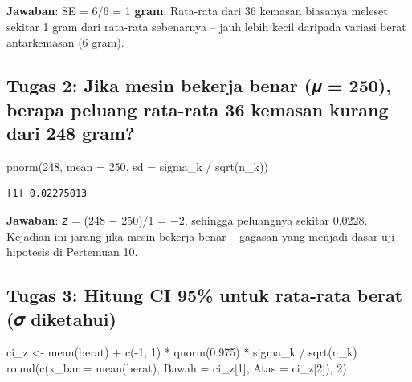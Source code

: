 \documentclass[
  indonesian,
  letterpaper,
]{book}
\newenvironment{Shaded}{\begin{snugshade}}{\end{snugshade}}
\newcommand{\AttributeTok}[1]{\textcolor[rgb]{0.40,0.45,0.13}{#1}}
\newcommand{\DecValTok}[1]{\textcolor[rgb]{0.68,0.00,0.00}{#1}}
\newcommand{\FloatTok}[1]{\textcolor[rgb]{0.68,0.00,0.00}{#1}}
\newcommand{\FunctionTok}[1]{\textcolor[rgb]{0.28,0.35,0.67}{#1}}
\newcommand{\NormalTok}[1]{\textcolor[rgb]{0.00,0.23,0.31}{#1}}
\newcommand{\OtherTok}[1]{\textcolor[rgb]{0.00,0.23,0.31}{#1}}
\newcommand{\SpecialCharTok}[1]{\textcolor[rgb]{0.37,0.37,0.37}{#1}}
\begin{document}
\textbf{Jawaban}: SE = 6/6 = 1 \textbf{gram}. Rata-rata dari 36 kemasan
biasanya meleset sekitar 1 gram dari rata-rata sebenarnya -- jauh lebih
kecil daripada variasi berat antarkemasan (6 gram).

\subsection{Tugas 2: Jika mesin bekerja benar (𝜇 = 250), berapa peluang
rata-rata 36 kemasan kurang dari 248
gram?}\label{tugas-2-jika-mesin-bekerja-benar-ux1d707-250-berapa-peluang-rata-rata-36-kemasan-kurang-dari-248-gram}

\begin{Shaded}
\begin{Highlighting}[]
\FunctionTok{pnorm}\NormalTok{(}\DecValTok{248}\NormalTok{, }\AttributeTok{mean =} \DecValTok{250}\NormalTok{, }\AttributeTok{sd =}\NormalTok{ sigma\_k }\SpecialCharTok{/} \FunctionTok{sqrt}\NormalTok{(n\_k))}
\end{Highlighting}
\end{Shaded}

\begin{verbatim}
[1] 0.02275013
\end{verbatim}

\textbf{Jawaban}: 𝑧 = (248 − 250)/1 = −2, sehingga peluangnya sekitar
0.0228. Kejadian ini jarang jika mesin bekerja benar -- gagasan yang
menjadi dasar uji hipotesis di Pertemuan 10.

\subsection{Tugas 3: Hitung CI 95\% untuk rata-rata berat (𝜎
diketahui)}\label{tugas-3-hitung-ci-95-untuk-rata-rata-berat-ux1d70e-diketahui}

\begin{Shaded}
\begin{Highlighting}[]
\NormalTok{ci\_z }\OtherTok{\textless{}{-}} \FunctionTok{mean}\NormalTok{(berat) }\SpecialCharTok{+} \FunctionTok{c}\NormalTok{(}\SpecialCharTok{{-}}\DecValTok{1}\NormalTok{, }\DecValTok{1}\NormalTok{) }\SpecialCharTok{*} \FunctionTok{qnorm}\NormalTok{(}\FloatTok{0.975}\NormalTok{) }\SpecialCharTok{*}\NormalTok{ sigma\_k }\SpecialCharTok{/} \FunctionTok{sqrt}\NormalTok{(n\_k)}
\FunctionTok{round}\NormalTok{(}\FunctionTok{c}\NormalTok{(}\AttributeTok{x\_bar =} \FunctionTok{mean}\NormalTok{(berat), }\AttributeTok{Bawah =}\NormalTok{ ci\_z[}\DecValTok{1}\NormalTok{], }\AttributeTok{Atas =}\NormalTok{ ci\_z[}\DecValTok{2}\NormalTok{]), }\DecValTok{2}\NormalTok{)}
\end{Highlighting}
\end{Shaded}
\end{document}
